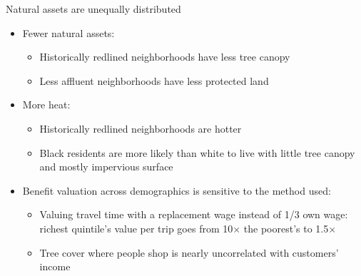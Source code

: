 \documentclass[aspectratio=169]{beamer}
\newcommand{\smallcite}[1]{\begingroup\scriptsize\citep{#1}\endgroup}
\begin{document}
\begin{frame}{Natural assets are unequally distributed}
    \begin{itemize}
        \item Fewer natural assets:
        \begin{itemize}
            \item Historically redlined neighborhoods have less tree canopy \smallcite{locke_residential_2020}
            \item Less affluent neighborhoods have less protected land\smallcite{simsEnvironmentalJusticeCriteria2022}
        \end{itemize}
        \item More heat:
        \begin{itemize}
            \item Historically redlined neighborhoods are hotter \smallcite{hoffmanEffectsHistoricalHousing2020,wilsonUrbanHeatManagement2020,conzelmannLongTermEffectsRedlining2022}
            \item Black residents are more likely than white to live with little tree canopy and mostly impervious surface \smallcite{jesdale_racialethnic_2013}
        \end{itemize}
        \item Benefit valuation across demographics is sensitive to the method used:
        \begin{itemize}
            \item Valuing travel time with a replacement wage instead of 1/3 own wage: richest quintile's value per trip goes from 10$\times$ the poorest's to 1.5$\times$ \smallcite{creelNationalValueLocal2026}
            \item Tree cover where people shop is nearly uncorrelated with customers' income \smallcite{creelValueNatureBasedAdaptation2026}
        \end{itemize}
    \end{itemize}
\end{frame}

\end{document}
